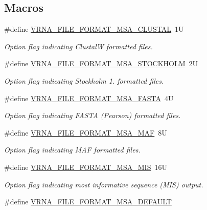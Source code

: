 \subsection*{Macros}
\begin{DoxyCompactItemize}
\item 
\#define \hyperlink{group__file__formats__msa_ga79a23de2c7249f2cccd762e475c81859}{V\+R\+N\+A\+\_\+\+F\+I\+L\+E\+\_\+\+F\+O\+R\+M\+A\+T\+\_\+\+M\+S\+A\+\_\+\+C\+L\+U\+S\+T\+AL}~1U
\begin{DoxyCompactList}\small\item\em Option flag indicating ClustalW formatted files. \end{DoxyCompactList}\item 
\#define \hyperlink{group__file__formats__msa_ga62be992445cd8ab2ad7a8fded944338b}{V\+R\+N\+A\+\_\+\+F\+I\+L\+E\+\_\+\+F\+O\+R\+M\+A\+T\+\_\+\+M\+S\+A\+\_\+\+S\+T\+O\+C\+K\+H\+O\+LM}~2U
\begin{DoxyCompactList}\small\item\em Option flag indicating Stockholm 1. formatted files. \end{DoxyCompactList}\item 
\#define \hyperlink{group__file__formats__msa_gacf6274a2c825f34e4131404665b00604}{V\+R\+N\+A\+\_\+\+F\+I\+L\+E\+\_\+\+F\+O\+R\+M\+A\+T\+\_\+\+M\+S\+A\+\_\+\+F\+A\+S\+TA}~4U
\begin{DoxyCompactList}\small\item\em Option flag indicating F\+A\+S\+TA (Pearson) formatted files. \end{DoxyCompactList}\item 
\#define \hyperlink{group__file__formats__msa_gab3186d774c01570d2a47d0308eec4927}{V\+R\+N\+A\+\_\+\+F\+I\+L\+E\+\_\+\+F\+O\+R\+M\+A\+T\+\_\+\+M\+S\+A\+\_\+\+M\+AF}~8U
\begin{DoxyCompactList}\small\item\em Option flag indicating M\+AF formatted files. \end{DoxyCompactList}\item 
\#define \hyperlink{group__file__formats__msa_ga494488a771aa0c602fb4cf445be34d47}{V\+R\+N\+A\+\_\+\+F\+I\+L\+E\+\_\+\+F\+O\+R\+M\+A\+T\+\_\+\+M\+S\+A\+\_\+\+M\+IS}~16U
\begin{DoxyCompactList}\small\item\em Option flag indicating most informative sequence (M\+IS) output. \end{DoxyCompactList}\item 
\#define \hyperlink{group__file__formats__msa_ga4acc255373831856a8417b68de8a94c0}{V\+R\+N\+A\+\_\+\+F\+I\+L\+E\+\_\+\+F\+O\+R\+M\+A\+T\+\_\+\+M\+S\+A\+\_\+\+D\+E\+F\+A\+U\+LT}

\end{DoxyCompactItemize}
